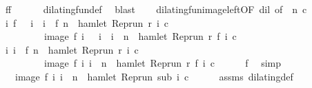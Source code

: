 \begin{isabellebody}
\ f{}{\isacharcolon}{\isacartoucheopen}f\ {}\ {\isacharequal}\ {}{\isacartoucheclose}\ \ \isamarkupfalse%
\ dilating{\isacharunderscore}fun{\isacharunderscore}def\ \isamarkupfalse%
\ blast\isanewline
\ \ \isamarkupfalse%
\ dilating{\isacharunderscore}fun{\isacharunderscore}image{\isacharunderscore}left{\isacharbrackleft}OF\ dil{\isacharcomma}\ of\ {\isacartoucheopen}{}{\isacartoucheclose}\ {\isacartoucheopen}n{\isacartoucheclose}\ {\isacartoucheopen}c{\isacartoucheclose}{\isacharbrackright}\isanewline
\ \ \isamarkupfalse%
\ {\isacartoucheopen}{\isacharbraceleft}i{\isachardot}\ f\ {}\ {\isasymle}\ i\ {\isasymand}\ i\ {\isacharless}\ f\ n\ {\isasymand}\ hamlet\ {\isacharparenleft}{\isacharparenleft}Rep{\isacharunderscore}run\ r{\isacharparenright}\ i\ c{\isacharparenright}{\isacharbraceright}\isanewline
\ \ \ \ \ \ \ \ {\isacharequal}\ image\ f\ {\isacharbraceleft}i{\isachardot}\ {}\ {\isasymle}\ i\ {\isasymand}\ i\ {\isacharless}\ n\ {\isasymand}\ hamlet\ {\isacharparenleft}{\isacharparenleft}Rep{\isacharunderscore}run\ r{\isacharparenright}\ {\isacharparenleft}f\ i{\isacharparenright}\ c{\isacharparenright}{\isacharbraceright}{\isacartoucheclose}\ \isacommand{{\isachardot}}\isamarkupfalse%
\isanewline
\ \ \isamarkupfalse%
\ {\isacartoucheopen}{\isacharbraceleft}i{\isachardot}\ i\ {\isacharless}\ f\ n\ {\isasymand}\ hamlet\ {\isacharparenleft}{\isacharparenleft}Rep{\isacharunderscore}run\ r{\isacharparenright}\ i\ c{\isacharparenright}{\isacharbraceright}\isanewline
\ \ \ \ \ \ \ \ {\isacharequal}\ image\ f\ {\isacharbraceleft}i{\isachardot}\ i\ {\isacharless}\ n\ {\isasymand}\ hamlet\ {\isacharparenleft}{\isacharparenleft}Rep{\isacharunderscore}run\ r{\isacharparenright}\ {\isacharparenleft}f\ i{\isacharparenright}\ c{\isacharparenright}{\isacharbraceright}{\isacartoucheclose}\isanewline
\ \ \ \ \isamarkupfalse%
\ f{}\ \isamarkupfalse%
\ simp\isanewline
\ \ \isamarkupfalse%
\ \isamarkupfalse%
\ {\isacartoucheopen}{\isachardot}{\isachardot}{\isachardot}\ {\isacharequal}\ image\ f\ {\isacharbraceleft}i{\isachardot}\ i\ {\isacharless}\ n\ {\isasymand}\ hamlet\ {\isacharparenleft}{\isacharparenleft}Rep{\isacharunderscore}run\ sub{\isacharparenright}\ i\ c{\isacharparenright}{\isacharbraceright}{\isacartoucheclose}\isanewline
\ \ \ \ \isamarkupfalse%
\ assms\ dilating{\isacharunderscore}def\ \isamarkupfalse%

\end{isabellebody}

